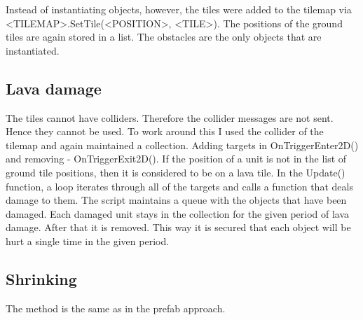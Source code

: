 \documentclass[11pt]{article}
\begin{document}
Instead of instantiating objects, however, the tiles were added to the tilemap via <TILEMAP>.SetTile(<POSITION>, <TILE>). The positions of the ground tiles are again stored in a list. The obstacles are the only objects that are instantiated.
\subsection{Lava damage}
\label{sec:orgcd44bdb}
The tiles cannot have colliders. Therefore the collider messages are not sent. Hence they cannot be used.
To work around this I used the collider of the tilemap and again maintained a collection. Adding targets in OnTriggerEnter2D() and removing - OnTriggerExit2D(). If the position of a unit is not in the list of ground tile positions, then it is considered to be on a lava tile.
In the Update() function, a loop iterates through all of the targets and calls a function that deals damage to them.
The script maintains a queue with the objects that have been damaged. Each damaged unit stays in the collection for the given period of lava damage. After that it is removed. This way it is secured that each object will be hurt a single time in the given period.
\subsection{Shrinking}
\label{sec:org1690afb}
The method is the same as in the prefab approach.
\end{document}
